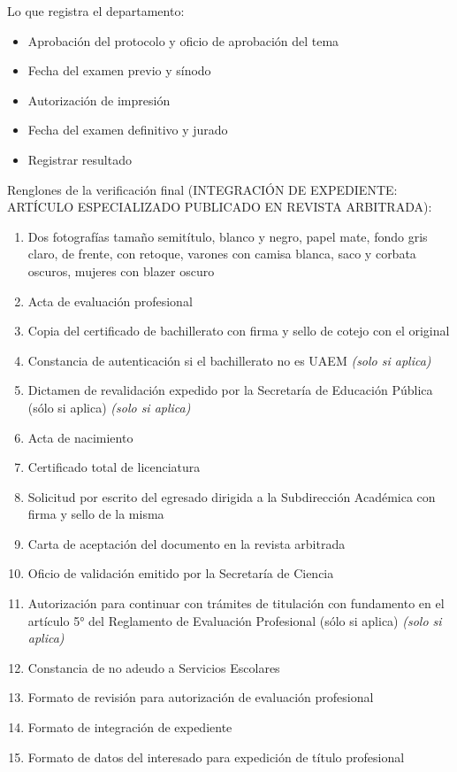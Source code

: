 Lo que registra el departamento:
\begin{itemize}
  \item Aprobación del protocolo y oficio de aprobación del tema
  \item Fecha del examen previo y sínodo
  \item Autorización de impresión
  \item Fecha del examen definitivo y jurado
  \item Registrar resultado
\end{itemize}
Renglones de la verificación final (INTEGRACIÓN DE EXPEDIENTE: ARTÍCULO ESPECIALIZADO PUBLICADO EN REVISTA ARBITRADA):
\begin{enumerate}
  \item Dos fotografías tamaño semitítulo, blanco y negro, papel mate, fondo gris claro, de frente, con retoque, varones con camisa blanca, saco y corbata oscuros, mujeres con blazer oscuro
  \item Acta de evaluación profesional
  \item Copia del certificado de bachillerato con firma y sello de cotejo con el original
  \item Constancia de autenticación si el bachillerato no es UAEM \emph{(solo si aplica)}
  \item Dictamen de revalidación expedido por la Secretaría de Educación Pública (sólo si aplica) \emph{(solo si aplica)}
  \item Acta de nacimiento
  \item Certificado total de licenciatura
  \item Solicitud por escrito del egresado dirigida a la Subdirección Académica con firma y sello de la misma
  \item Carta de aceptación del documento en la revista arbitrada
  \item Oficio de validación emitido por la Secretaría de Ciencia
  \item Autorización para continuar con trámites de titulación con fundamento en el artículo 5° del Reglamento de Evaluación Profesional (sólo si aplica) \emph{(solo si aplica)}
  \item Constancia de no adeudo a Servicios Escolares
  \item Formato de revisión para autorización de evaluación profesional
  \item Formato de integración de expediente
  \item Formato de datos del interesado para expedición de título profesional
\end{enumerate}
